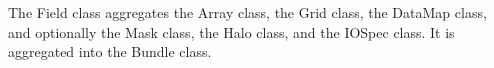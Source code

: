 

The Field class aggregates the Array class, the Grid class, 
the DataMap class, and optionally the Mask class, the Halo class,
and the IOSpec class. It is aggregated into the Bundle class.



